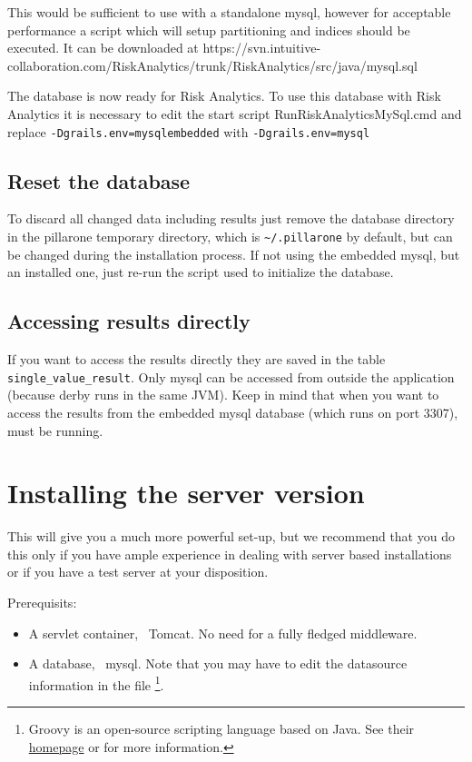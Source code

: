 This would be sufficient to use \RA{} with a standalone mysql, however for acceptable performance a script which will setup partitioning and indices should be executed.
It can be downloaded at https://svn.intuitive-collaboration.com/RiskAnalytics/trunk/RiskAnalytics/src/java/mysql.sql

The database is now ready for Risk Analytics. To use this database with Risk Analytics it is necessary to edit the start script RunRiskAnalyticsMySql.cmd
and replace \texttt{-Dgrails.env=mysqlembedded} with \texttt{-Dgrails.env=mysql}

\subsection{Reset the database}

To discard all changed data including results just remove the database directory in the pillarone temporary directory, which is \texttt{\~{}/.pillarone} by default, but can be changed during the installation process.
If not using the embedded mysql, but an installed one, just re-run the script used to initialize the database.

\subsection{Accessing results directly} 

If you want to access the results directly they are saved in the table \texttt{single\_value\_result}. Only mysql can be accessed from outside the application (because derby runs in the same JVM).
Keep in mind that when you want to access the results from the embedded mysql database (which runs on port 3307), \RA{} must be running. 

\section{Installing the server version}
\label{sec:refguide-install-server}

This will give you a much more powerful set-up, but we recommend that you do this only if you have ample experience in dealing with server based installations or if you have a test server at your disposition.

Prerequisits: 
\begin{itemize}
	\item A servlet container, \eg~Tomcat. No need for a fully fledged middleware.
	\item A database, \eg~mysql. Note that you may have to edit the datasource 
		information in the file %
		\footnote{Groovy 
			is an open-source scripting language based on Java.
			See their \href{http://groovy.codehaus.org/}{homepage} 
			or \cite{GroovyIA07} for more information.}.
\end{itemize}


